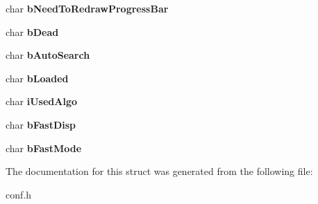 \begin{DoxyCompactItemize}
\item 
\hypertarget{structstructProgramInfo___a65129e2493422ba13d40331421e30fa2}{
char {\bfseries bNeedToRedrawProgressBar}}
\label{structstructProgramInfo___a65129e2493422ba13d40331421e30fa2}

\item 
\hypertarget{structstructProgramInfo___ad0ab717415d9b4fd31d03b94d1f5eecc}{
char {\bfseries bDead}}
\label{structstructProgramInfo___ad0ab717415d9b4fd31d03b94d1f5eecc}

\item 
\hypertarget{structstructProgramInfo___adaf59d89f5e25e10a69c094c1877c3f4}{
char {\bfseries bAutoSearch}}
\label{structstructProgramInfo___adaf59d89f5e25e10a69c094c1877c3f4}

\item 
\hypertarget{structstructProgramInfo___a76473ba773c82093b3f4834abdd12ea0}{
char {\bfseries bLoaded}}
\label{structstructProgramInfo___a76473ba773c82093b3f4834abdd12ea0}

\item 
\hypertarget{structstructProgramInfo___afb20081fb01e4e787f30b80390b7c637}{
char {\bfseries iUsedAlgo}}
\label{structstructProgramInfo___afb20081fb01e4e787f30b80390b7c637}

\item 
\hypertarget{structstructProgramInfo___ad8a6cc3950d8ca09aa3347be2d9587cb}{
char {\bfseries bFastDisp}}
\label{structstructProgramInfo___ad8a6cc3950d8ca09aa3347be2d9587cb}

\item 
\hypertarget{structstructProgramInfo___a2f19d1e89b08a0d82355636919cdb4e8}{
char {\bfseries bFastMode}}
\label{structstructProgramInfo___a2f19d1e89b08a0d82355636919cdb4e8}

\end{DoxyCompactItemize}


The documentation for this struct was generated from the following file:\begin{DoxyCompactItemize}
\item 
conf.h\end{DoxyCompactItemize}
